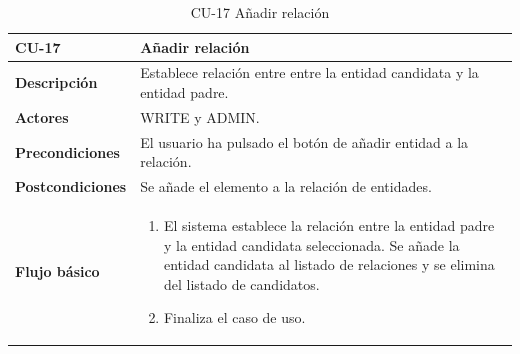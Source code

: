 \begin{table} [H]
    \centering
    \setlength{\leftmargini}{0.4cm}
	\resizebox{14cm}{!} { %
    \begin{tabular}{| m{3cm} | m{11cm} |}   
    \hline
	  \textbf{CU-17} & \textbf{Añadir relación} \\\hline
	  \textbf{Descripción} & Establece relación entre entre la entidad candidata y la entidad padre. \\\hline
	  \textbf{Actores} & WRITE y ADMIN. \\\hline
	  \textbf{Precondiciones} & El usuario ha pulsado el botón de añadir entidad a la relación. \\\hline
	  \textbf{Postcondiciones} & Se añade el elemento a la relación de entidades. \\\hline
	  \textbf{Flujo básico} & 
		\begin{enumerate}
	  	\item El sistema establece la relación entre la entidad padre y la entidad candidata seleccionada. Se añade la entidad candidata al listado de relaciones y se elimina del listado de candidatos.
		\item Finaliza el caso de uso.				
	  \end{enumerate} 	  	  
	  \\\hline
    \end{tabular}
    } %
    \caption{CU-17 Añadir relación}
    \label{tab:cu-anhadir-relacion}
\end{table}

